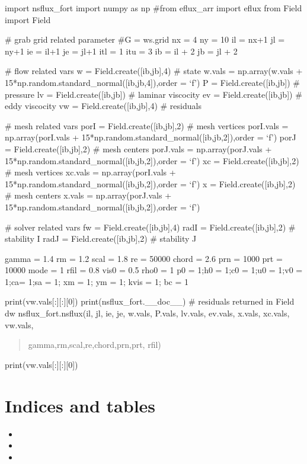 \documentclass[letterpaper,10pt,english]{sphinxmanual}
\begin{document}
\sphinxAtStartPar
import nsflux\_fort
import numpy as np
\#from eflux\_arr import eflux
from Field import Field

\sphinxAtStartPar
\# grab grid related parameter
\#G = ws.grid
nx = 4
ny = 10
il = nx+1
jl = ny+1
ie = il+1
je = jl+1
itl = 1
itu = 3
ib = il + 2
jb = jl + 2

\sphinxAtStartPar
\# flow related vars
w = Field.create({[}ib,jb{]},4) \# state
w.vals = np.array(w.vals + 15*np.random.standard\_normal({[}ib,jb,4{]}),order = ‘f’)
P = Field.create({[}ib,jb{]}) \# pressure
lv = Field.create({[}ib,jb{]}) \# laminar viscocity
ev = Field.create({[}ib,jb{]}) \# eddy viscocity
vw = Field.create({[}ib,jb{]},4) \# residuals

\sphinxAtStartPar
\# mesh related vars
porI = Field.create({[}ib,jb{]},2) \# mesh vertices
porI.vals = np.array(porI.vals + 15*np.random.standard\_normal({[}ib,jb,2{]}),order = ‘f’)
porJ = Field.create({[}ib,jb{]},2) \# mesh centers
porJ.vals = np.array(porJ.vals + 15*np.random.standard\_normal({[}ib,jb,2{]}),order = ‘f’)
xc = Field.create({[}ib,jb{]},2) \# mesh vertices
xc.vals = np.array(porI.vals + 15*np.random.standard\_normal({[}ib,jb,2{]}),order = ‘f’)
x = Field.create({[}ib,jb{]},2) \# mesh centers
x.vals = np.array(porJ.vals + 15*np.random.standard\_normal({[}ib,jb,2{]}),order = ‘f’)

\sphinxAtStartPar
\# solver related vars
fw = Field.create({[}ib,jb{]},4)
radI = Field.create({[}ib,jb{]},2) \# stability I
radJ = Field.create({[}ib,jb{]},2) \# stability J

\sphinxAtStartPar
gamma = 1.4
rm = 1.2
scal = 1.8
re = 50000
chord = 2.6
prn = 1000
prt = 10000
mode = 1
rfil = 0.8
vis0 = 0.5
rho0 = 1
p0 = 1;h0 = 1;c0 = 1;u0 = 1;v0 = 1;ca= 1;sa = 1; xm = 1; ym = 1; kvis = 1; bc = 1

\sphinxAtStartPar
print(vw.vals{[}:{]}{[}:{]}{[}0{]})
print(nsflux\_fort.\_\_doc\_\_)
\# residuals returned in Field dw
nsflux\_fort.nsflux(il, jl, ie, je,       w.vals, P.vals, lv.vals, ev.vals,        x.vals, xc.vals,       vw.vals,
\begin{quote}

\sphinxAtStartPar
gamma,rm,scal,re,chord,prn,prt,       rfil)
\end{quote}

\sphinxAtStartPar
print(vw.vals{[}:{]}{[}:{]}{[}0{]})


\chapter{Indices and tables}
\label{\detokenize{index:indices-and-tables}}\begin{itemize}
\item {} 
\sphinxAtStartPar
{}

\item {} 
\sphinxAtStartPar
{}

\item {} 
\sphinxAtStartPar
{}

\end{itemize}
\end{document}
